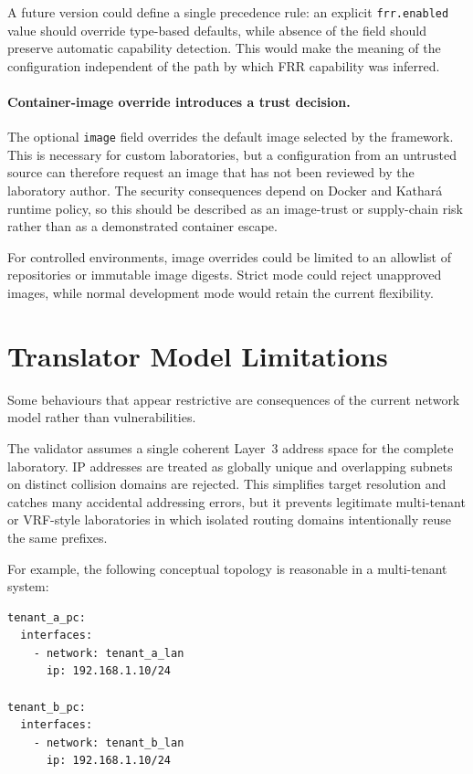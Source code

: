 A future version could define a single precedence rule: an explicit
\texttt{frr.enabled} value should override type-based defaults, while absence
of the field should preserve automatic capability detection. This would make
the meaning of the configuration independent of the path by which FRR
capability was inferred.

\paragraph{Container-image override introduces a trust decision.}
The optional \texttt{image} field overrides the default image selected by the
framework. This is necessary for custom laboratories, but a configuration from
an untrusted source can therefore request an image that has not been reviewed
by the laboratory author. The security consequences depend on Docker and
Kathar\'a runtime policy, so this should be described as an image-trust or
supply-chain risk rather than as a demonstrated container escape.

For controlled environments, image overrides could be limited to an allowlist
of repositories or immutable image digests. Strict mode could reject
unapproved images, while normal development mode would retain the current
flexibility.

\section{Translator Model Limitations}
\label{sec:translator-model-limitations}

Some behaviours that appear restrictive are consequences of the current
network model rather than vulnerabilities.

The validator assumes a single coherent Layer~3 address space for the complete
laboratory. IP addresses are treated as globally unique and overlapping
subnets on distinct collision domains are rejected. This simplifies target
resolution and catches many accidental addressing errors, but it prevents
legitimate multi-tenant or VRF-style laboratories in which isolated routing
domains intentionally reuse the same prefixes.

For example, the following conceptual topology is reasonable in a
multi-tenant system:

\begin{lstlisting}[caption={Address reuse that is meaningful only when routing domains are isolated.},
label={lst:overlapping-tenant-example}]
tenant_a_pc:
  interfaces:
    - network: tenant_a_lan
      ip: 192.168.1.10/24

tenant_b_pc:
  interfaces:
    - network: tenant_b_lan
      ip: 192.168.1.10/24
\end{lstlisting}

